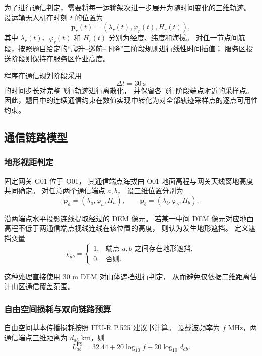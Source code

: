 为了进行通信判定，需要将每一运输架次进一步展开为随时间变化的三维轨迹。
设运输无人机在时刻 $t$ 的位置为
\begin{equation}
	\mathbf{p}_r(t)
	=\left(\lambda_r(t),\varphi_r(t),H_r(t)\right),
	\label{eq:q3-trajectory}
\end{equation}
其中 $\lambda_r(t)$、$\varphi_r(t)$ 和 $H_r(t)$ 分别为经度、纬度和海拔。
对任一节点间航段，按照题目给定的“爬升--巡航--下降”三阶段规则进行线性时间插值；
服务区投送阶段则保持在服务区作业高度。

程序在通信规划阶段采用
\begin{equation}
	\Delta t=30\ \mathrm{s}
	\label{eq:q3-sample-step}
\end{equation}
的时间步长对完整飞行轨迹进行离散化，
并保留各飞行阶段端点附近的采样点。
因此，题目中的连续通信约束在数值实现中转化为对全部轨迹采样点的逐点可用性约束。

\subsection{通信链路模型}

\subsubsection{地形视距判定}

固定网关 G01 位于 O01，
其通信端点海拔由 O01 地面高程与网关天线离地高度共同确定。
对任意两个通信端点 $a,b$，
设三维位置分别为
\[
\mathbf{p}_a=(\lambda_a,\varphi_a,H_a),\qquad
\mathbf{p}_b=(\lambda_b,\varphi_b,H_b).
\]

沿两端点水平投影连线提取经过的 DEM 像元。
若某一中间 DEM 像元对应地面高程不低于两通信端点视线连线在该位置的高度，
则认为发生地形遮挡。
定义遮挡变量
\begin{equation}
	\chi_{ab}=
	\begin{cases}
		1,&\text{端点 }a,b\text{ 之间存在地形遮挡},\\
		0,&\text{否则}.
	\end{cases}
	\label{eq:q3-block}
\end{equation}

这种处理直接使用 30 m DEM 对山体遮挡进行判定，
从而避免仅依据二维距离估计山区通信覆盖范围。

\subsubsection{自由空间损耗与双向链路预算}

自由空间基本传播损耗按照 ITU-R P.525 建议书计算\cite{q3-itu525}。
设载波频率为 $f$ MHz，两通信端点三维距离为 $d_{ab}$ km，则
\begin{equation}
	L_{ab}^{\mathrm{FS}}
	=32.44+20\log_{10}f+20\log_{10}d_{ab}.
	\label{eq:q3-fspl}
\end{equation}

